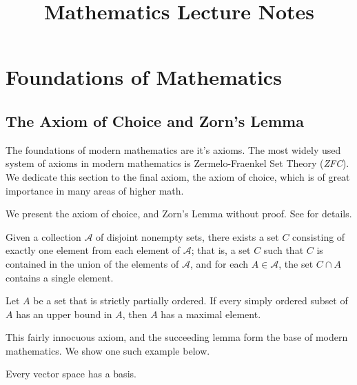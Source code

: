 \documentclass[a4paper]{report}
\title{Mathematics Lecture Notes}
\begin{document}
  
\maketitle
\tableofcontents

\chapter{Foundations of Mathematics}

\section{The Axiom of Choice and Zorn's Lemma}

The foundations of modern mathematics are it's axioms. The most widely used system of axioms in modern mathematics is Zermelo-Fraenkel Set Theory (\textit{ZFC}). We dedicate this section to the final axiom, the axiom of choice, which is of great importance in many areas of higher math.

We present the axiom of choice, and Zorn's Lemma without proof. See \cite{munkrestopology} for details.

\begin{definition}
  Given a collection $\mathcal{A}$ of disjoint nonempty sets, there exists a set $C$ consisting of exactly one element from each element of $\mathcal{A}$; that is, a set $C$ such that $C$ is contained in the union of the elements of $\mathcal{A}$, and for each $A \in \mathcal{A}$, the set $C\cap A$ contains a single element.
\end{definition}

\begin{lemma}
  Let $A$ be a set that is strictly partially ordered. If every simply ordered subset of $A$ has an upper bound in $A$, then $A$ has a maximal element.
\end{lemma}

This fairly innocuous axiom, and the succeeding lemma form the base of modern mathematics. We show one such example below.

\begin{theorem}
  Every vector space has a basis.
\end{theorem}
\end{document}
